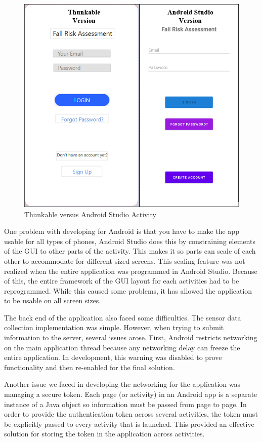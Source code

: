 \documentclass[conference]{IEEEtran}
\begin{document}
\begin{figure}[!htb]
\centering
\includegraphics[scale=0.5]{img/Thunkable_vs_android_studio.png}
\caption{Thunkable versus Android Studio Activity}
\label{thunkvsandroid}
\end{figure}

One problem with developing for Android is that you have to make the app usable for all types of phones, Android Studio does this by constraining elements of the GUI to other parts of the activity. This makes it so parts can scale of each other to accommodate for different sized screens. This scaling feature was not realized when the entire application was programmed in Android Studio. Because of this, the entire framework of the GUI layout for each activities had to be reprogrammed. While this caused some problems, it has allowed the application to be usable on all screen sizes.

The back end of the application also faced some difficulties. The sensor data collection implementation was simple. However, when trying to submit information to the server, several issues arose. First, Android restricts networking on the main application thread because any networking delay can freeze the entire application. In development, this warning was disabled to prove functionality and then re-enabled for the final solution. 

Another issue we faced in developing the networking for the application was managing a secure token. Each page (or activity) in an Android app is a separate instance of a Java object so information must be passed from page to page. In order to provide the authentication token across several activities, the token must be explicitly passed to every activity that is launched. This provided an effective solution for storing the token in the application across activities. 
\end{document}
